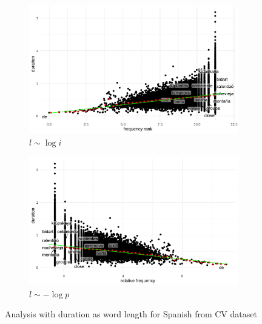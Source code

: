 \begin{figure}[H]
  \centering
  \begin{subfigure}[b]{0.48\textwidth}
    \centering
    \includegraphics[width=\textwidth]{plots/Spanish_logi_d_CV.pdf}
    \caption{$l \sim \log i$}
  \end{subfigure}
  \hfill
  \begin{subfigure}[b]{0.48\textwidth}
    \centering
    \includegraphics[width=\textwidth]{plots/Spanish_logp_d_CV.pdf}
    \caption{$l \sim -\log p$}
  \end{subfigure}
  \caption{Analysis with duration as word length for Spanish from CV dataset}
\end{figure}

